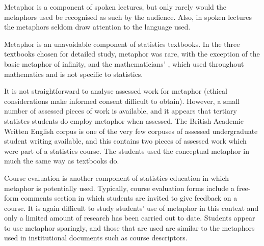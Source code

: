 Metaphor is a component of spoken lectures, but only rarely would the
metaphors used be recognised as such by the audience.  Also, in spoken
lectures the metaphors seldom draw attention to the language used.

Metaphor is an unavoidable component of statistics textbooks.  In the
three textbooks chosen for detailed study, metaphor was rare, with the
exception of the basic metaphor of infinity, and the mathematicians'
, which used throughout mathematics and is not specific to
statistics.

It is not straightforward to analyse assessed work for metaphor
(ethical considerations make informed consent difficult to obtain).
However, a small number of assessed pieces of work is available, and
it appears that tertiary statistcs students do employ metaphor when
assessed.  The British Academic Written English corpus is one of the
very few corpuses of assessed undergraduate student writing available,
and this contains two pieces of assessed work which were part of a
statistics course.  The students used the conceptual metaphor
 in much the same way as textbooks do.

Course evaluation is another component of statistics education in
which metaphor is potentially used.  Typically, course evaluation
forms include a free-form comments section in which students are
invited to give feedback on a course.  It is again difficult to study
students' use of metaphor in this context and only a limited amount of
research has been carried out to date.  Students appear to use
metaphor sparingly, and those that are used are similar to the
metaphors used in institutional documents such as course descriptors.


%
%
%
